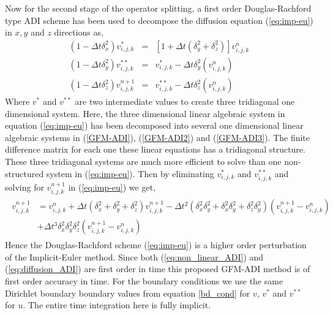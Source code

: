 Now for the second stage of the operator splitting, a first order Douglas-Rachford type ADI scheme has been used to decompose the diffusion equation (\ref{eq:imp-eu}) in $x,y$ and $z$ directions as,  
\begin{eqnarray}
		\left(1- \Delta t \delta_x^2\right)v_{i,j,k}^{*}&=&\left[1+ \Delta t \left(\delta_y^2+\delta_z^2 \right)\right]v_{i,j,k}^{n}\label{GFM-ADI}\\
		\left(1-\Delta t \delta_y^2\right)v_{i,j,k}^{**}&=&v_{i,j,k}^{*}- \Delta t \delta_y^2\left(v_{i,j,k}^{n}\right)\label{GFM-ADI2}\\
		\left(1- \Delta t \delta_z^2\right)v_{i,j,k}^{n+1}&=&v_{i,j,k}^{**}- \Delta t \delta_z^2\left(v_{i,j,k}^{n}\right)\label{GFM-ADI3}
\end{eqnarray} 
Where $v^*$ and $v^{**}$ are two intermediate values to create three tridiagonal one dimensional system. Here, the three dimensional linear algebraic system in equation (\ref{eq:imp-eu}) has been decomposed into several one dimensional linear algebraic systems in (\ref{GFM-ADI}), (\ref{GFM-ADI2}) and (\ref{GFM-ADI3}). The finite difference matrix for each one these linear equations has a tridiagonal structure. These three tridiagonal systems are much more efficient to solve than one non-structured system in (\ref{eq:imp-eu}). Then by eliminating $v^*_{i,j,k}$ and $v^{**}_{i,j,k}$ and solving for $v^{n+1}_{i,j,k}$ in (\ref{eq:imp-eu}) we get,
\begin{eqnarray}
\begin{aligned}
	v^{n+1}_{i,j,k}&=v^n_{i,j,k}+ \Delta t \left(\delta_x^2+\delta_y^2+\delta_z^2\right) v^{n+1}_{i,j,k} -\Delta t^2 \left(\delta_x^2\delta_y^2+\delta_x^2\delta_y^2+\delta_z^2\delta_y^2\right)(v^{n+1}_{i,j,k}-v^{n}_{i,j,k})\\
	&+ \Delta t^3 \delta_x^2\delta_y^2\delta_z^2(v^{n+1}_{i,j,k}-v^{n}_{i,j,k}) \label{adi_tailor}
	\end{aligned}
\end{eqnarray}
Hence the Douglas-Rachford scheme (\ref{eq:imp-eu}) is a higher order perturbation of the Implicit-Euler method. Since both (\ref{eq:non_linear_ADI}) and (\ref{eq:diffusion_ADI}) are first order in time this proposed GFM-ADI method is of first order accuracy in time. For the boundary conditions we use the same Dirichlet boundary boundary values from equation \ref{bd_cond} for $v$, $v^*$ and  $v^{**}$ for $u$. The entire time integration here is fully implicit. 


